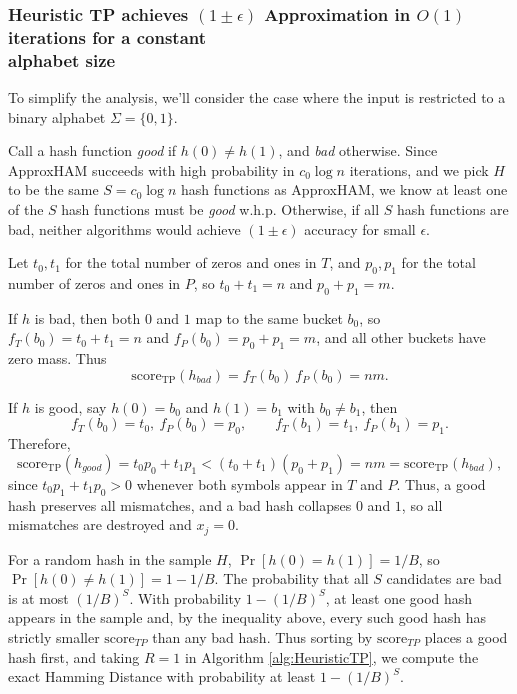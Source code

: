 \documentclass{article}
\theoremstyle{definition}
\newcommand{\eps}{\epsilon}
\newcommand{\score}{\text{score}}
\begin{document}
\subsubsection{Heuristic TP achieves $(1\pm\epsilon)$ Approximation in $O(1)$ iterations for a constant\\ alphabet size}

To simplify the analysis, we'll consider the case where the input is restricted to a binary alphabet $\Sigma=\{0,1\}$.

Call a hash function \textit{good} if $h(0)\ne h(1)$, and \textit{bad} otherwise.
Since ApproxHAM succeeds with high probability in $c_0\log n$ iterations, and we pick $H$ to be the same $S=c_0\log n$ hash functions as ApproxHAM, we know at least one of the $S$ hash functions must be \textit{good} w.h.p. Otherwise, if all $S$ hash functions are bad, neither algorithms would achieve $(1\pm \eps)$ accuracy for small $\eps$.

Let $t_0,t_1$ for the total number of zeros and ones in $T$, and
$p_0,p_1$ for the total number of zeros and ones in $P$, so
$t_0+t_1=n$ and $p_0+p_1=m$.

If $h$ is bad, then both $0$ and $1$ map to the same bucket $b_0$, so $f_T(b_0) = t_0+t_1 = n$ and $f_P(b_0) = p_0+p_1 = m$, and all other buckets have zero mass. Thus
$$\score_\text{TP}(h_{bad}) = f_T(b_0) \ f_P(b_0) = nm.$$

If $h$ is good, say $h(0)=b_0$ and $h(1)=b_1$ with $b_0\neq b_1$, then
\[
f_T(b_0)=t_0,\ f_P(b_0)=p_0,\qquad
f_T(b_1)=t_1,\ f_P(b_1)=p_1.
\]
Therefore,
\[
\score_\text{TP}(h_{good})
  = t_0 p_0 + t_1 p_1
  < (t_0+t_1)(p_0+p_1) = nm = \score_\text{TP}(h_{bad}),
\]
since $t_0p_1 + t_1p_0 > 0$ whenever both symbols appear in $T$ and $P$. Thus, a good hash preserves all mismatches, and a bad hash collapses $0$ and $1$, so all mismatches are destroyed and $x_j=0$.


For a random hash in the sample $H$, $\Pr[h(0)=h(1)] = 1/B$, so
$\Pr[h(0)\neq h(1)] = 1-1/B$. The probability that all $S$ candidates
are bad is at most $(1/B)^S$. With probability $1-(1/B)^S$, at least one good hash appears in the sample and, by the inequality above, every such good hash has strictly smaller $\score_{TP}$ than any bad hash. Thus sorting by $\score_{TP}$ places a good hash first, and taking $R=1$ in Algorithm \ref{alg:HeuristicTP}, we compute the exact Hamming Distance with probability at least $1-(1/B)^S$.
\end{document}
